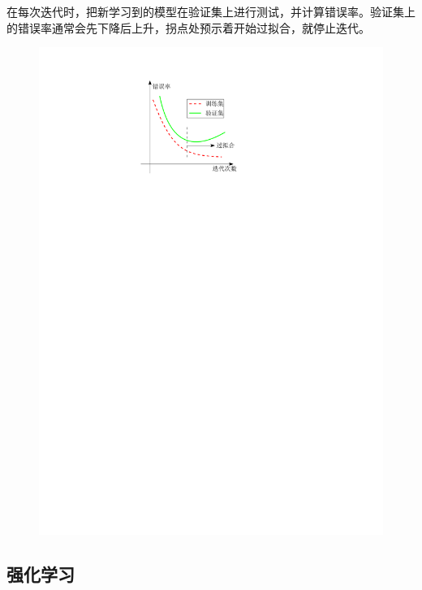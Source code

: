 \begin{note}
\begin{itemize}
\begin{itemize}
            在每次迭代时，把新学习到的模型在验证集上进行测试，并计算错误率。验证集上的错误率通常会先下降后上升，拐点处预示着开始过拟合，就停止迭代。
            \begin{figure}[htbp]
                \centering
                \includegraphics{image/提前停止.pdf}
            \end{figure}
        \end{itemize}
    \end{itemize}
\end{note}
\subsection{强化学习}
